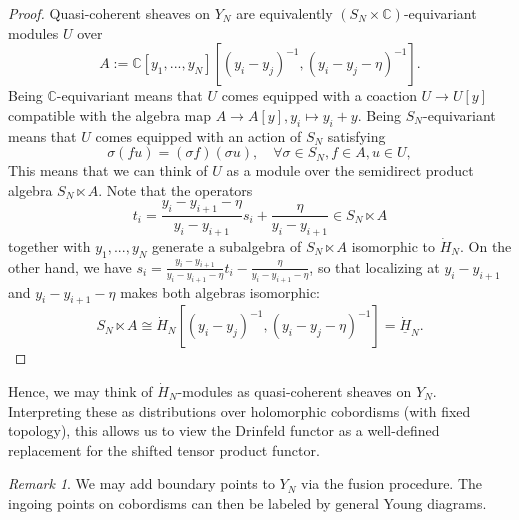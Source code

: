 \documentclass[11pt]{report}
\theoremstyle{definition}
\theoremstyle{remark}
\newtheorem*{remark}{Remark}
\theoremstyle{remark}
\newcommand{\C}{\mathbb{C}}
\begin{document}
\begin{proof}
Quasi-coherent sheaves on $Y_N$ are equivalently $(S_N \times \C)$-equivariant modules $U$ over
\begin{equation*}
A := \C[y_1,...,y_N][(y_i-y_j)^{-1},(y_i-y_j-\eta)^{-1}].
\end{equation*}
Being $\C$-equivariant means that $U$ comes equipped with a coaction $U \to U[y]$ compatible with the algebra map $A \to A[y], y_i \mapsto y_i+y$. Being $S_N$-equivariant means that $U$ comes equipped with an action of $S_N$ satisfying
\begin{equation*}
\sigma (f u) = (\sigma f) (\sigma u), \quad \forall \sigma \in S_N, f \in A, u \in U,
\end{equation*}
This means that we can think of $U$ as a module over the semidirect product algebra $S_N \ltimes A$. Note that the operators
\begin{equation*}
t_i = \frac{y_i-y_{i+1}-\eta}{y_i-y_{i+1}} s_i + \frac{\eta}{y_i-y_{i+1}} \in S_N \ltimes A
\end{equation*}
together with $y_1,...,y_N$ generate a subalgebra of $S_N \ltimes A$ isomorphic to $\dot H_N$. On the other hand, we have $s_i = \frac{y_i-y_{i+1}}{y_i-y_{i+1}-\eta} t_i - \frac{\eta}{y_i-y_{i+1}-\eta}$, so that localizing at $y_i-y_{i+1}$ and $y_i-y_{i+1}-\eta$ makes both algebras isomorphic:
\begin{equation*}
S_N \ltimes A \cong \dot H_N[(y_i-y_j)^{-1},(y_i-y_j-\eta)^{-1}] = \underline{\dot H}_N.
\end{equation*}
\end{proof}

Hence, we may think of $\dot H_N$-modules as quasi-coherent sheaves on $Y_N$. Interpreting these as distributions over holomorphic cobordisms (with fixed topology), this allows us to view the Drinfeld functor as a well-defined replacement for the shifted tensor product functor.

\begin{remark}
We may add boundary points to $Y_N$ via the fusion procedure. The ingoing points on cobordisms can then be labeled by general Young diagrams.
\end{remark}
\end{document}
